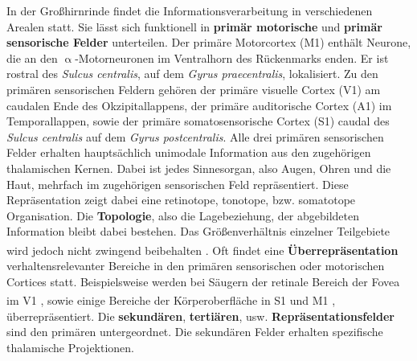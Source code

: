 \documentclass[12pt,a4paper,pdftex]{article}
\begin{document}
In der Großhirnrinde findet die Informationsverarbeitung in verschiedenen Arealen statt. Sie lässt sich funktionell in \textbf{primär motorische} und \textbf{primär sensorische Felder} unterteilen. Der primäre Motorcortex (M1) enthält Neurone, die an den $\upalpha$-Motorneuronen im Ventralhorn des Rückenmarks enden. Er ist rostral des \textit{Sulcus centralis}, auf dem \textit{Gyrus praecentralis}, lokalisiert. Zu den primären sensorischen Feldern gehören der primäre visuelle Cortex (V1) am caudalen Ende des Okzipitallappens, der primäre auditorische Cortex (A1) im Temporallappen, sowie der primäre somatosensorische Cortex (S1) caudal des \textit{Sulcus centralis} auf dem \textit{Gyrus postcentralis}. Alle drei primären sensorischen Felder erhalten hauptsächlich unimodale Information aus den zugehörigen thalamischen Kernen. Dabei ist jedes Sinnesorgan, also Augen, Ohren und die Haut, mehrfach im zugehörigen sensorischen Feld repräsentiert. Diese Repräsentation zeigt dabei eine retinotope, tonotope, bzw. somatotope Organisation. Die \textbf{Topologie}, also die Lagebeziehung, der abgebildeten Information bleibt dabei bestehen. Das Größenverhältnis einzelner Teilgebiete wird jedoch nicht zwingend beibehalten \textsuperscript{\cite[14]{penzlin2005tierphys}}. Oft findet eine \textbf{Überrepräsentation} verhaltensrelevanter Bereiche in den primären sensorischen oder motorischen Cortices statt. Beispielsweise werden bei Säugern der retinale Bereich der Fovea im V1 \textsuperscript{\cite{overrepresentation_fovea}}, sowie einige Bereiche der Körperoberfläche in S1 und M1 \textsuperscript{\cite[14]{penzlin2005tierphys}}, überrepräsentiert. Die \textbf{sekundären}, \textbf{tertiären}, usw. \textbf{Repräsentationsfelder} sind den primären untergeordnet. Die sekundären Felder erhalten spezifische thalamische Projektionen.\\
\end{document}
